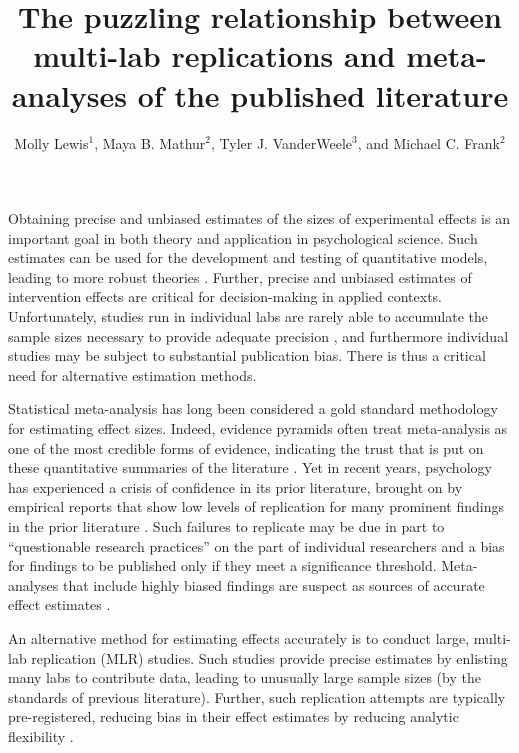\documentclass[man,floatsintext]{apa7}
\title{The puzzling relationship between multi-lab replications and 
meta-analyses of the published literature
}
\author{Molly Lewis$^{1}$, Maya B. Mathur$^{2}$, Tyler J. VanderWeele$^{3}$, and Michael C. Frank$^{2}$}
\affiliation{$^{1}$Carnegie Mellon University\\
$^{2}$Stanford University\\
$^{3}$Harvard University}
\begin{document}
\maketitle


Obtaining precise and unbiased estimates of the sizes of experimental effects is an important goal in both theory and application in psychological science. Such estimates can be used for the development and testing of quantitative models, leading to more robust theories \parencite{oberauer2019addressing}. Further, precise and unbiased estimates of intervention effects are critical for decision-making in applied contexts. Unfortunately, studies run in individual labs are rarely able to accumulate the sample sizes necessary to provide adequate precision \parencite{simonsohn_2014}, and furthermore individual studies may be subject to substantial publication bias.  There is thus a critical need for alternative estimation methods. 

Statistical meta-analysis \parencite{gurevitch2018meta,dersimonian1986meta} has long been considered a gold standard methodology for estimating effect sizes. Indeed, evidence pyramids often treat meta-analysis as one of the most credible forms of evidence, indicating the trust that is put on these quantitative summaries of the literature \parencite{higgins2019cochrane}. Yet in recent years, psychology has experienced a crisis of confidence in its prior literature, brought on by empirical reports that show low levels of replication for many prominent findings in the prior literature \parencite{open2015estimating,klein2014investigating,klein2018many,ebersole2016many,ebersole2020many}. Such failures to replicate may be due in part to “questionable research practices” on the part of individual researchers \parencite[e.g., post-hoc analytic decision-making;][]{masicampo2012peculiar} and a bias for findings to be published only if they meet a significance threshold. Meta-analyses that include highly biased findings are suspect as sources of accurate effect estimates  \parencite[or even as indicators of whether an effect is consistently non-zero;][]{vadillo2016selection}. 

An alternative method for estimating effects accurately is to conduct large, multi-lab replication (MLR) studies. Such studies provide precise estimates by enlisting many labs to contribute data, leading to unusually large sample sizes (by the standards of previous literature). Further, such replication attempts are typically pre-registered, reducing bias in their effect estimates by reducing analytic flexibility \parencite{nosek2018preregistration}. 
\end{document}

